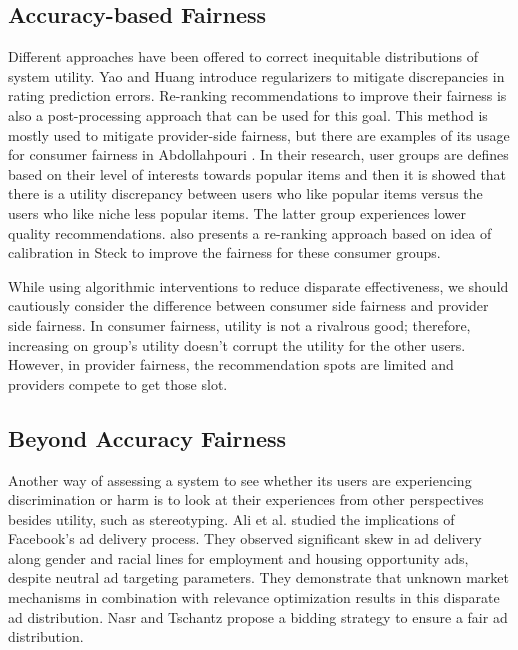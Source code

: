     \subsection{Accuracy-based Fairness}
        Different approaches have been offered to correct inequitable distributions of system utility. Yao and Huang \cite{yao2017beyond} introduce regularizers to mitigate discrepancies in rating prediction errors. Re-ranking recommendations to improve their fairness is also a post-processing approach that can be used for this goal. This method is mostly used to mitigate provider-side fairness, but there are examples of its usage for consumer fairness in Abdollahpouri \cite{abdollahpouri2020popularity}. In their research, user groups are defines based on their level of interests towards popular items and then it is showed that there is a utility discrepancy between users who like popular items versus the users who like niche less popular items. The latter group experiences lower quality recommendations. \cite{abdollahpouri2020addressing} also presents a re-ranking approach based on idea of calibration in Steck \cite{steck2018calibrated} to improve the fairness for these consumer groups.
    
        While using algorithmic interventions to reduce disparate effectiveness, we should cautiously consider the difference between consumer side fairness and provider side fairness. In consumer fairness, utility is not a rivalrous good; therefore, increasing on group's utility doesn't corrupt the utility for the other users. However, in provider fairness, the recommendation spots are limited and providers compete to get those slot. 
    
    \subsection{Beyond Accuracy Fairness}
    
        Another way of assessing a system to see whether its users are experiencing discrimination or harm is to look at their experiences from other perspectives besides utility, such as stereotyping. Ali et al.\cite{Ali2019Facebook} studied the implications of Facebook's ad delivery process. They observed significant skew in ad delivery along gender and racial lines for employment and housing opportunity ads, despite neutral ad targeting parameters. They demonstrate that unknown market mechanisms in combination with relevance optimization results in this disparate ad distribution. Nasr and Tschantz \cite{nasr2020bidding} propose a bidding strategy to ensure a fair ad distribution. 
        
